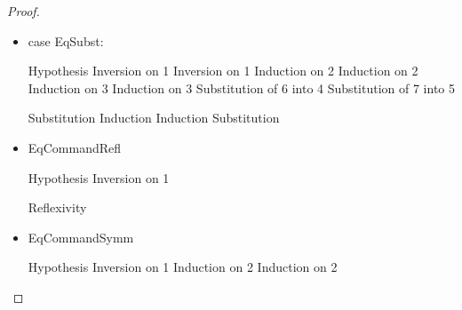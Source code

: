 \begin{proof}
\begin{itemize}
\item case EqSubst:
  \begin{eqnproof}
              {Hypothesis}
              {Inversion on 1}
              {Inversion on 1}
              {Induction on 2}
              {Induction on 2}
              {Induction on 3}
              {Induction on 3}
              {Substitution of 6 into 4}
              {Substitution of 7 into 5}
  \end{eqnproof}

  \begin{eqnproof}[\interpE{\judgeE{\Gamma}{[e_2/x]e_1}{B}}\;\theta\;\gamma =]
           {Substitution}
           {Induction}
           {Induction}
           {Substitution}
  \end{eqnproof}

\item EqCommandRefl
  \begin{eqnproof}
              {Hypothesis}
              {Inversion on 1}
  \end{eqnproof}

  \begin{eqnproof}
          {Reflexivity}
  \end{eqnproof}

\item EqCommandSymm
   \begin{eqnproof}
               {Hypothesis}
               {Inversion on 1}
               {Induction on 2}
               {Induction on 2}
   \end{eqnproof}


\end{itemize}
\end{proof}
